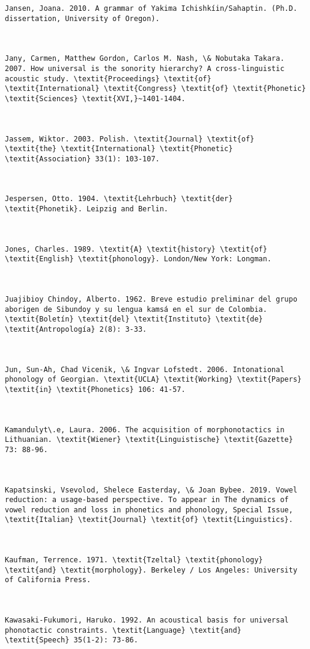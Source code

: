 \begin{verbatim}
Jansen, Joana. 2010. A grammar of Yakima Ichishkíin/Sahaptin. (Ph.D. dissertation, University of Oregon).



Jany, Carmen, Matthew Gordon, Carlos M. Nash, \& Nobutaka Takara. 2007. How universal is the sonority hierarchy? A cross-linguistic acoustic study. \textit{Proceedings} \textit{of} \textit{International} \textit{Congress} \textit{of} \textit{Phonetic} \textit{Sciences} \textit{XVI,}~1401-1404.



Jassem, Wiktor. 2003. Polish. \textit{Journal} \textit{of} \textit{the} \textit{International} \textit{Phonetic} \textit{Association} 33(1): 103-107.



Jespersen, Otto. 1904. \textit{Lehrbuch} \textit{der} \textit{Phonetik}. Leipzig and Berlin.



Jones, Charles. 1989. \textit{A} \textit{history} \textit{of} \textit{English} \textit{phonology}. London/New York: Longman.



Juajibioy Chindoy, Alberto. 1962. Breve estudio preliminar del grupo aborigen de Sibundoy y su lengua kamsá en el sur de Colombia. \textit{Boletín} \textit{del} \textit{Instituto} \textit{de} \textit{Antropología} 2(8): 3-33.



Jun, Sun-Ah, Chad Vicenik, \& Ingvar Lofstedt. 2006. Intonational phonology of Georgian. \textit{UCLA} \textit{Working} \textit{Papers} \textit{in} \textit{Phonetics} 106: 41-57.



Kamandulyt\.e, Laura. 2006. The acquisition of morphonotactics in Lithuanian. \textit{Wiener} \textit{Linguistische} \textit{Gazette} 73: 88-96.



Kapatsinski, Vsevolod, Shelece Easterday, \& Joan Bybee. 2019. Vowel reduction: a usage-based perspective. To appear in The dynamics of vowel reduction and loss in phonetics and phonology, Special Issue, \textit{Italian} \textit{Journal} \textit{of} \textit{Linguistics}.



Kaufman, Terrence. 1971. \textit{Tzeltal} \textit{phonology} \textit{and} \textit{morphology}. Berkeley / Los Angeles: University of California Press.



Kawasaki-Fukumori, Haruko. 1992. An acoustical basis for universal phonotactic constraints. \textit{Language} \textit{and} \textit{Speech} 35(1-2): 73-86.




\end{verbatim}
